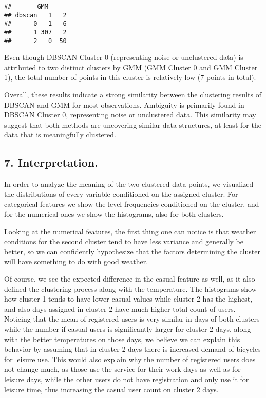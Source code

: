 \documentclass[
]{article}
\begin{document}
\begin{verbatim}
##       GMM
## dbscan   1   2
##      0   1   6
##      1 307   2
##      2   0  50
\end{verbatim}

Even though DBSCAN Cluster 0 (representing noise or unclustered data) is
attributed to two distinct clusters by GMM (GMM Cluster 0 and GMM
Cluster 1), the total number of points in this cluster is relatively low
(7 points in total).

Overall, these results indicate a strong similarity between the
clustering results of DBSCAN and GMM for most observations. Ambiguity is
primarily found in DBSCAN Cluster 0, representing noise or unclustered
data. This similarity may suggest that both methods are uncovering
similar data structures, at least for the data that is meaningfully
clustered.

\hypertarget{interpretation.}{%
\subsection{7. Interpretation.}\label{interpretation.}}

In order to analyze the meaning of the two clustered data points, we
visualized the distributions of every variable conditioned on the
assigned cluster. For categorical features we show the level frequencies
conditioned on the cluster, and for the numerical ones we show the
histograms, also for both clusters.

Looking at the numerical features, the first thing one can notice is
that weather conditions for the second cluster tend to have less
variance and generally be better, so we can confidently hypothesize that
the factors determining the cluster will have something to do with good
weather.

Of course, we see the expected difference in the casual feature as well,
as it also defined the clustering process along with the temperature.
The histograms show how cluster 1 tends to have lower casual values
while cluster 2 has the highest, and also days assigned in cluster 2
have much higher total count of users. Noticing that the mean of
registered users is very similar in days of both clusters while the
number if casual users is significantly larger for cluster 2 days, along
with the better temperatures on those days, we believe we can explain
this behavior by assuming that in cluster 2 days there is increased
demand of bicycles for leisure use. This would also explain why the
number of registered users does not change much, as those use the
service for their work days as well as for leisure days, while the other
users do not have registration and only use it for leisure time, thus
increasing the casual user count on cluster 2 days.
\end{document}
